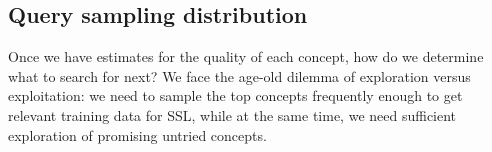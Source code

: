 \subsection{Query sampling distribution}
\label{subsec:tiering}
Once we have estimates for the quality of each concept, how do we determine what to search for next?
We face the age-old dilemma of exploration versus exploitation:
we need to sample the top concepts frequently enough to get relevant training data for SSL, while at the same time, we need sufficient exploration of promising untried concepts.

